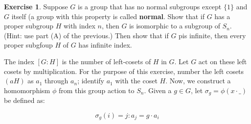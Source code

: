 \documentclass[11pt,oneside]{article}
\numberwithin{equation}{section}
\theoremstyle{definition}
\newtheorem{exercise}{Exercise}
\begin{document}
\begin{exercise}
  Suppose $G$ is a group that has no normal subgroups except $\{ 1 \}$ and $G$ itself (a group with this
  property is called \textbf{normal}. Show that if $G$ has a proper subgroup $H$ with index $n$,
  then $G$ is isomorphic to a subgroup of $S_n$. (Hint: use part (A) of the previous.)  Then show that if $G$
  pis infinite, then every proper subgfoup $H$ of $G$ has infinite index. 
\end{exercise}
\begin{solution}
  The index $[G:H]$ is the number of left-cosets of $H$ in $G$.  Let
  $G$ act on these left cosets by multiplication.  For the purpose of
  this exercise, number the left cosets $(aH)$ as $a_1$ through $a_n$;
  identify $a_1$ with the coset $H$.  Now, we construct a homomorphism
  $\phi$ from this group action to $S_n$. Given a $g \in G$, let
  $\sigma_g = \phi(x \cdot \_ )$ be defined as:

  $$
  \sigma_g(i) = j : a_j = g \cdot a_i
  $$

  
  
  
\end{solution}

\begin{comment}
  \begin{exercise}
    problem
  \end{exercise}
  \begin{solution}
    \Begin{enumerate}[(a)]
    \item
      first answer
    \end{enumerate}
  \end{solution}
\end{comment}
\end{document}
